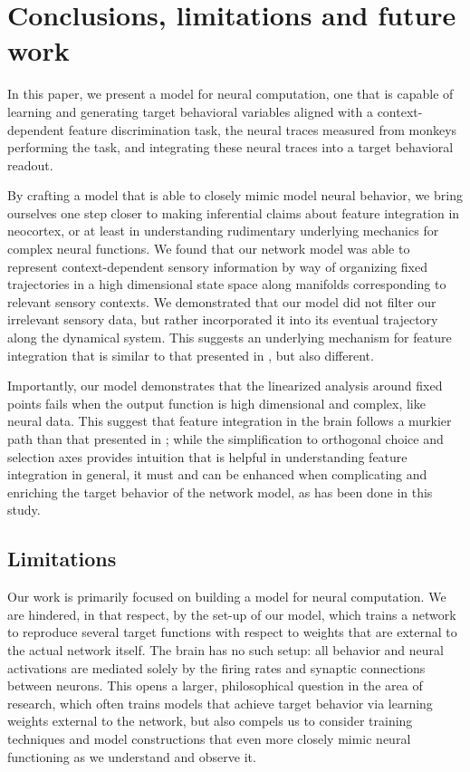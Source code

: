 \documentclass[12pt,a4paper,final]{iopart}
\begin{document}
\section{Conclusions, limitations and future work}
\label{sec:con}
In this paper, we present a model for neural computation, one that is capable of learning and generating target behavioral variables aligned with a context-dependent feature discrimination task, the neural traces measured from monkeys performing the task, and integrating these neural traces into a target behavioral readout. 

By crafting a model that is able to closely mimic model neural behavior, we bring ourselves one step closer to making inferential claims about feature integration in neocortex, or at least in understanding rudimentary underlying mechanics for complex neural functions. We found that our network model was able to represent context-dependent sensory information by way of organizing fixed trajectories in a high dimensional state space along manifolds corresponding to relevant sensory contexts. We demonstrated that our model did not filter our irrelevant sensory data, but rather incorporated it into its eventual trajectory along the dynamical system. This suggests an underlying mechanism for feature integration that is similar to that presented in \cite{Mante2013}, but also different. 

Importantly, our model demonstrates that the linearized analysis around fixed points fails when the output function is high dimensional and complex, like neural data. This suggest that feature integration in the brain follows a murkier path than that presented in \cite{Mante2013}; while the simplification to orthogonal choice and selection axes provides intuition that is helpful in understanding feature integration in general, it must and can be enhanced when complicating and enriching the target behavior of the network model, as has been done in this study.

\subsection{Limitations}
Our work is primarily focused on building a model for neural computation. We are hindered, in that respect, by the set-up of our model, which trains a network to reproduce several target functions with respect to weights that are external to the actual network itself. The brain has no such setup: all behavior and neural activations are mediated solely by the firing rates and synaptic connections between neurons. This opens a larger, philosophical question in the area of research, which often trains models that achieve target behavior via learning weights external to the network, but also compels us to consider training techniques and model constructions that even more closely mimic neural functioning as we understand and observe it. 
\end{document}
